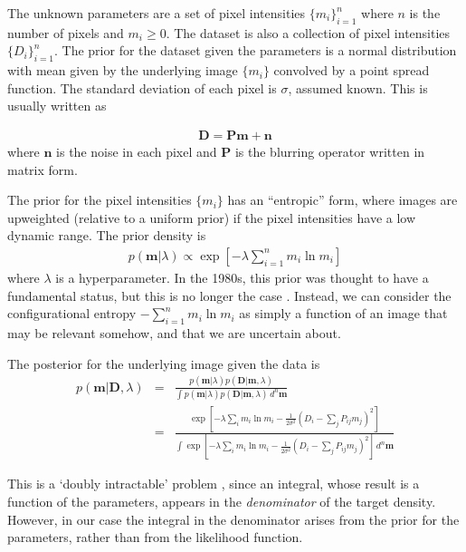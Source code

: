 \documentclass[journal,article,accept,moreauthors,pdftex,12pt,a4paper]{mdpi}
\begin{document}
The unknown parameters are a set of pixel intensities
$\{m_i\}_{i=1}^n$ where $n$ is the number of pixels and $m_i \geq 0$.
The dataset is also a collection of pixel intensities $\{D_i\}_{i=1}^n$.
The prior for the dataset given the parameters is a normal distribution
with mean given by the underlying image $\{m_i\}$ convolved by
a point spread function. The standard deviation of each pixel is
$\sigma$, assumed known. This is usually written as

\begin{eqnarray}
\boldsymbol{D} = \boldsymbol{P}\boldsymbol{m} + \boldsymbol{n}
\end{eqnarray}
where $\boldsymbol{n}$ is the noise in each pixel and $\boldsymbol{P}$ is
the blurring operator written in matrix form.

The prior for the pixel intensities $\{m_i\}$ has an ``entropic'' form,
where images are upweighted (relative to a uniform prior) if the pixel
intensities have a low dynamic range. The prior density is
\begin{eqnarray}
p(\boldsymbol{m} | \lambda) \propto \exp
\left[
-\lambda \sum_{i=1}^n m_i \ln m_i
\right]
\end{eqnarray}
where $\lambda$ is a hyperparameter.
In the 1980s, this prior was thought to have a fundamental status, but this
is no longer the case \citep{massinf}. Instead, we can consider the configurational
entropy $-\sum_{i=1}^n m_i \ln m_i$ as simply a function of an image that may
be relevant somehow, and that we are uncertain about.

The posterior for the underlying image given the data is
\begin{eqnarray}
p(\boldsymbol{m} | \boldsymbol{D}, \lambda)
&=& \frac{p(\boldsymbol{m} | \lambda)p(\boldsymbol{D}|\boldsymbol{m}, \lambda)}
{\int p(\boldsymbol{m}|\lambda)p(\boldsymbol{D}|\boldsymbol{m}, \lambda) \,d^n\boldsymbol{m}}\\
&=& \frac{\exp\left[-\lambda \sum_i m_i\ln m_i
-\frac{1}{2\sigma^2}\left(D_i - \sum_{j} P_{ij}m_{j}\right)^2\right]}
{\int \exp\left[-\lambda \sum_i m_i\ln m_i
-\frac{1}{2\sigma^2}\left(D_i - \sum_{j} P_{ij}m_{j}\right)^2\right]\, d^n\boldsymbol{m}}
\end{eqnarray}

This is a `doubly intractable' problem \citep{murray}, since an integral, whose
result is a function of the parameters, appears in the {\em denominator} of the
target density. However, in our case the integral in the
denominator arises from the prior for the parameters, rather than from the
likelihood function.
\end{document}
